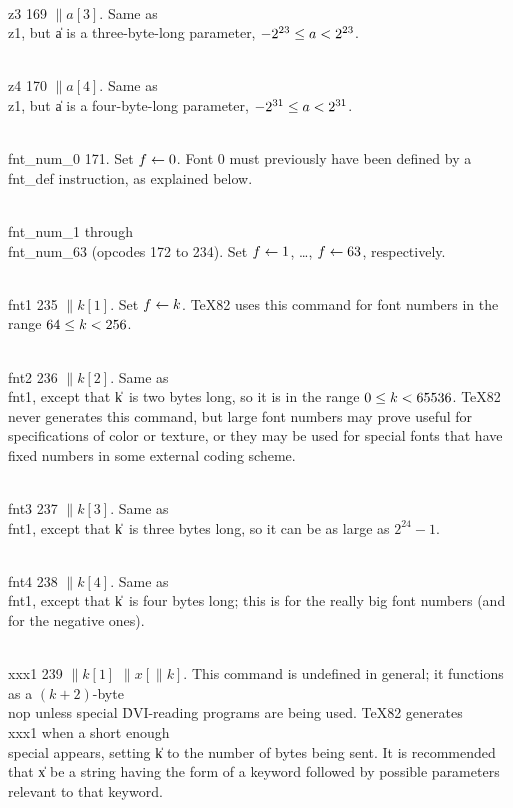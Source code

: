 \yskip\hang\\{z3} 169 $\|a[3]$. Same as \\{z1}, but \|a is a three-byte-long
parameter, $\hbox{$-2^{23}$}\le\hbox{$a$}<\hbox{$2^{23}$}$.

\yskip\hang\\{z4} 170 $\|a[4]$. Same as \\{z1}, but \|a is a four-byte-long
parameter, $\hbox{$-2^{31}$}\le\hbox{$a$}<\hbox{$2^{31}$}$.

\yskip\hang\\{fnt\_num\_0} 171. Set $\hbox{$f$}\gets0$. Font 0 must previously have been
defined by a \\{fnt\_def} instruction, as explained below.

\yskip\hang\\{fnt\_num\_1} through \\{fnt\_num\_63} (opcodes 172 to 234). Set
$\hbox{$f$}\gets1$, \dots, $\hbox{$f$}\gets63$, respectively.

\yskip\hang\\{fnt1} 235 $\|k[1]$. Set $\hbox{$f$}\gets\hbox{$k$}$. \TeX82 uses this command for
font
numbers in the range $64\le\hbox{$k$}<256$.

\yskip\hang\\{fnt2} 236 $\|k[2]$. Same as \\{fnt1}, except that \|k~is two
bytes long, so it is in the range $0\le\hbox{$k$}<65536$. \TeX82 never generates this
command, but large font numbers may prove useful for specifications of
color or texture, or they may be used for special fonts that have fixed
numbers in some external coding scheme.

\yskip\hang\\{fnt3} 237 $\|k[3]$. Same as \\{fnt1}, except that \|k~is three
bytes long, so it can be as large as $2^{24}-1$.

\yskip\hang\\{fnt4} 238 $\|k[4]$. Same as \\{fnt1}, except that \|k~is four
bytes long; this is for the really big font numbers (and for the negative
ones).

\yskip\hang\\{xxx1} 239 $\|k[1]$ $\|x[\|k]$. This command is undefined in
general; it functions as a $(k+2)$-byte \\{nop} unless special \.{DVI}-reading
programs are being used. \TeX82 generates \\{xxx1} when a short enough
\.{\\special} appears, setting \|k to the number of bytes being sent. It
is recommended that \|x be a string having the form of a keyword followed
by possible parameters relevant to that keyword.

